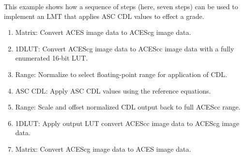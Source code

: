 \label{appendixA}

This example shows how a sequence of steps (here, seven steps) can be used to implement an LMT that applies ASC CDL values to effect a grade.

\begin{enumerate}
    \item Matrix:   \tabto{0.75in}Convert ACES image data to ACEScg image data.
    \item 1DLUT:    \tabto{0.75in}Convert ACEScg image data to ACEScc image data with a fully enumerated 16-bit LUT.
    \item Range:    \tabto{0.75in}Normalize to select floating-point range for application of CDL.
    \item ASC CDL:  \tabto{0.75in}Apply ASC CDL values using the reference equations.
    \item Range:    \tabto{0.75in}Scale and offset normalized CDL output back to full ACEScc range.
    \item 1DLUT:    \tabto{0.75in}Apply output LUT convert ACEScc image data to ACEScg image data.
    \item Matrix:   \tabto{0.75in}Convert ACEScg image data to ACES image data.
\end{enumerate}


\vspace{18pt}

